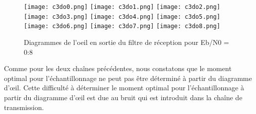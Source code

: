 \documentclass[11pt]{article}
\begin{document}
\begin{figure}[ht!]
            \centering
            \texttt{[image: c3do0.png]}
            \texttt{[image: c3do1.png]}
            \texttt{[image: c3do2.png]}
            \texttt{[image: c3do3.png]}
            \texttt{[image: c3do4.png]}
            \texttt{[image: c3do5.png]}
            \texttt{[image: c3do6.png]}
            \texttt{[image: c3do7.png]}
            \texttt{[image: c3do8.png]}
            \caption{ Diagrammes de l’oeil en sortie du filtre de réception pour Eb/N0 = 0:8
            \label{fig : Oeil3}}

            
\end{figure}
Comme pour les deux chaînes précédentes, nous constatons que le moment optimal pour l'échantillonnage ne peut pas être déterminé à partir du diagramme d'œil. Cette difficulté à déterminer le moment optimal pour l'échantillonnage à partir du diagramme d'œil est due au bruit qui est introduit dans la chaîne de transmission.
\newpage
{}
\end{document}
